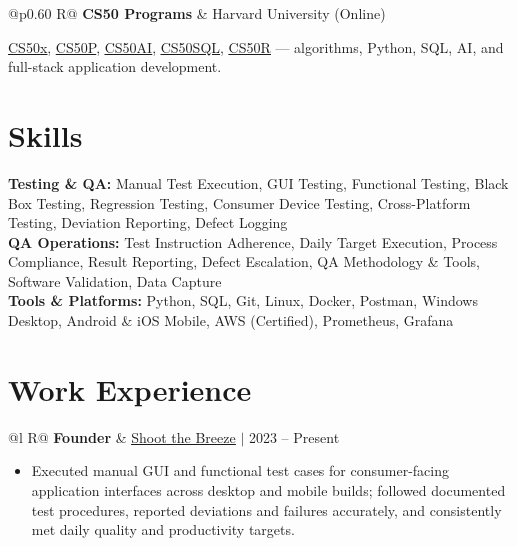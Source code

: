 \documentclass[a4paper,10pt]{article}
\newcommand{\ulink}[2]{\href{#1}{\uline{#2}}}
\newcommand{\subheading}[1]{{\color[HTML]{0A0A0A}\fontsize{12}{14}\selectfont\bfseries #1}}
\newcommand{\meta}[1]{{\color[HTML]{5C5C5C}\fontsize{10.5}{12.5}\selectfont #1}}
\begin{document}
\begin{tabularx}{\linewidth}{@{}p{0.60\linewidth} R@{}}
\subheading{CS50 Programs} & \meta{Harvard University (Online)}
\end{tabularx}
\vspace{1pt}
{\color[HTML]{3A3A3A}\fontsize{11}{14}\selectfont \ulink{https://cs50.harvard.edu/certificates/b14b78df-e05c-413e-a607-1dd27303053a}{CS50x}, \ulink{https://cs50.harvard.edu/certificates/32477052-9db4-49c4-a5a4-d7e58429ca2c}{CS50P}, \ulink{https://cs50.harvard.edu/certificates/9cdb4d4a-1250-4f8e-9fd7-191864e0f919}{CS50AI}, \ulink{https://cs50.harvard.edu/certificates/bc486f24-f085-4e61-8536-80940b97a1b9}{CS50SQL}, \ulink{https://cs50.harvard.edu/certificates/666838e6-a053-4d82-b179-a60fe745fd84}{CS50R} --- algorithms, Python, SQL, AI, and full-stack application development.}

\vspace{2pt}

\section{Skills}
\vspace{3pt}
{\color[HTML]{0A0A0A}\fontsize{11}{14}\selectfont
\textbf{Testing \& QA:} Manual Test Execution, GUI Testing, Functional Testing, Black Box Testing, Regression Testing, Consumer Device Testing, Cross-Platform Testing, Deviation Reporting, Defect Logging \\[2pt]
\textbf{QA Operations:} Test Instruction Adherence, Daily Target Execution, Process Compliance, Result Reporting, Defect Escalation, QA Methodology \& Tools, Software Validation, Data Capture \\[2pt]
\textbf{Tools \& Platforms:} Python, SQL, Git, Linux, Docker, Postman, Windows Desktop, Android \& iOS Mobile, AWS (Certified), Prometheus, Grafana}

\vspace{2pt}

\section{Work Experience}
\vspace{2pt}

\begin{tabularx}{\linewidth}{@{}l R@{}}
\subheading{Founder} & \meta{\ulink{https://shoot-the-breeze.vercel.app}{Shoot the Breeze} $|$ 2023 -- Present}
\end{tabularx}
\begin{itemize}[nosep, leftmargin=1.5em, itemsep=1pt, topsep=2pt]
  \item {\color[HTML]{0A0A0A}\fontsize{11}{14}\selectfont Executed manual GUI and functional test cases for consumer-facing application interfaces across desktop and mobile builds; followed documented test procedures, reported deviations and failures accurately, and consistently met daily quality and productivity targets.}
\end{itemize}
\end{document}
